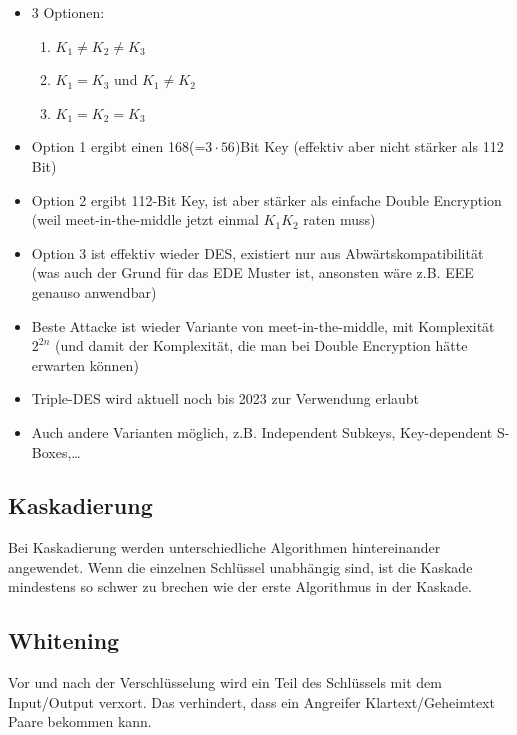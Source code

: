 \begin{itemize}
    \item 3 Optionen:
    \begin{enumerate}
        \item $K_1 \neq K_2 \neq K_3$
        \item $K_1 = K_3$ und $K_1 \neq K_2$
        \item $K_1 = K_2 = K_3$
    \end{enumerate}
    \item Option 1 ergibt einen 168(=$3\cdot 56$)Bit Key (effektiv aber nicht stärker als 112 Bit)
    \item Option 2 ergibt 112-Bit Key, ist aber stärker als einfache Double Encryption (weil meet-in-the-middle jetzt einmal $K_1K_2$ raten muss)
    \item Option 3 ist effektiv wieder DES, existiert nur aus Abwärtskompatibilität (was auch der Grund für das EDE Muster ist, ansonsten wäre z.B. EEE genauso anwendbar)
    \item Beste Attacke ist wieder Variante von meet-in-the-middle, mit Komplexität $2^{2n}$ (und damit der Komplexität, die man bei Double Encryption hätte erwarten 
    können)
    \item Triple-DES wird aktuell noch bis 2023 zur Verwendung erlaubt
    \item Auch andere Varianten möglich, z.B. Independent Subkeys, Key-dependent S-Boxes,\ldots
\end{itemize}

\subsection{Kaskadierung}

Bei Kaskadierung werden unterschiedliche Algorithmen hintereinander angewendet. Wenn die einzelnen Schlüssel unabhängig sind, ist die Kaskade mindestens so schwer zu 
brechen wie der erste Algorithmus in der Kaskade.

\subsection{Whitening}

Vor und nach der Verschlüsselung wird ein Teil des Schlüssels mit dem Input/Output verxort. Das verhindert, dass ein Angreifer Klartext/Geheimtext Paare bekommen kann.